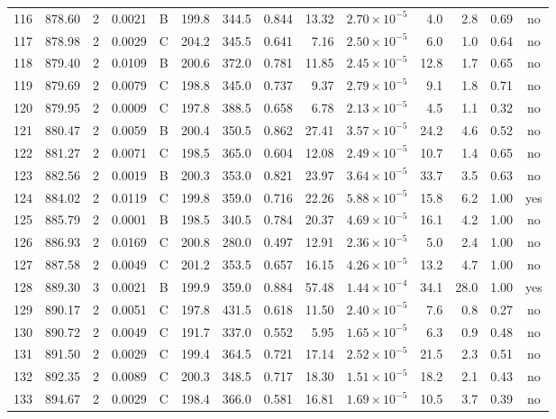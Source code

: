 \begin{landscape}
\begin{longtable}{rrrrlrrrrrrrrc}
116 & 878.60 & 2 & 0.0021 & B & 199.8 & 344.5 & 0.844 & 13.32 & $2.70\times10^{-5}$ & 4.0 & 2.8 & 0.69 & no \\
117 & 878.98 & 2 & 0.0029 & C & 204.2 & 345.5 & 0.641 & 7.16 & $2.50\times10^{-5}$ & 6.0 & 1.0 & 0.64 & no \\
118 & 879.40 & 2 & 0.0109 & B & 200.6 & 372.0 & 0.781 & 11.85 & $2.45\times10^{-5}$ & 12.8 & 1.7 & 0.65 & no \\
119 & 879.69 & 2 & 0.0079 & C & 198.8 & 345.0 & 0.737 & 9.37 & $2.79\times10^{-5}$ & 9.1 & 1.8 & 0.71 & no \\
120 & 879.95 & 2 & 0.0009 & C & 197.8 & 388.5 & 0.658 & 6.78 & $2.13\times10^{-5}$ & 4.5 & 1.1 & 0.32 & no \\
121 & 880.47 & 2 & 0.0059 & B & 200.4 & 350.5 & 0.862 & 27.41 & $3.57\times10^{-5}$ & 24.2 & 4.6 & 0.52 & no \\
122 & 881.27 & 2 & 0.0071 & C & 198.5 & 365.0 & 0.604 & 12.08 & $2.49\times10^{-5}$ & 10.7 & 1.4 & 0.65 & no \\
123 & 882.56 & 2 & 0.0019 & B & 200.3 & 353.0 & 0.821 & 23.97 & $3.64\times10^{-5}$ & 33.7 & 3.5 & 0.63 & no \\
124 & 884.02 & 2 & 0.0119 & C & 199.8 & 359.0 & 0.716 & 22.26 & $5.88\times10^{-5}$ & 15.8 & 6.2 & 1.00 & yes \\
125 & 885.79 & 2 & 0.0001 & B & 198.5 & 340.5 & 0.784 & 20.37 & $4.69\times10^{-5}$ & 16.1 & 4.2 & 1.00 & no \\
126 & 886.93 & 2 & 0.0169 & C & 200.8 & 280.0 & 0.497 & 12.91 & $2.36\times10^{-5}$ & 5.0 & 2.4 & 1.00 & no \\
127 & 887.58 & 2 & 0.0049 & C & 201.2 & 353.5 & 0.657 & 16.15 & $4.26\times10^{-5}$ & 13.2 & 4.7 & 1.00 & no \\
128 & 889.30 & 3 & 0.0021 & B & 199.9 & 359.0 & 0.884 & 57.48 & $1.44\times10^{-4}$ & 34.1 & 28.0 & 1.00 & yes \\
129 & 890.17 & 2 & 0.0051 & C & 197.8 & 431.5 & 0.618 & 11.50 & $2.40\times10^{-5}$ & 7.6 & 0.8 & 0.27 & no \\
130 & 890.72 & 2 & 0.0049 & C & 191.7 & 337.0 & 0.552 & 5.95 & $1.65\times10^{-5}$ & 6.3 & 0.9 & 0.48 & no \\
131 & 891.50 & 2 & 0.0029 & C & 199.4 & 364.5 & 0.721 & 17.14 & $2.52\times10^{-5}$ & 21.5 & 2.3 & 0.51 & no \\
132 & 892.35 & 2 & 0.0089 & C & 200.3 & 348.5 & 0.717 & 18.30 & $1.51\times10^{-5}$ & 18.2 & 2.1 & 0.43 & no \\
133 & 894.67 & 2 & 0.0029 & C & 198.4 & 366.0 & 0.581 & 16.81 & $1.69\times10^{-5}$ & 10.5 & 3.7 & 0.39 & no \\

\end{longtable}
\end{landscape}

